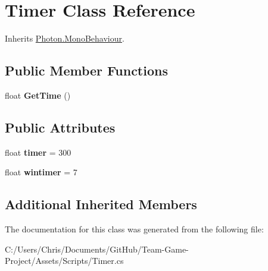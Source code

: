 \hypertarget{class_timer}{}\section{Timer Class Reference}
\label{class_timer}


Inherits \hyperlink{class_photon_1_1_mono_behaviour}{Photon.\+Mono\+Behaviour}.

\subsection*{Public Member Functions}
\begin{DoxyCompactItemize}
\item 
float {\bfseries Get\+Time} ()\hypertarget{class_timer_a9e4207f2a92a1fab9b42559291cb82ee}{}\label{class_timer_a9e4207f2a92a1fab9b42559291cb82ee}

\end{DoxyCompactItemize}
\subsection*{Public Attributes}
\begin{DoxyCompactItemize}
\item 
float {\bfseries timer} = 300\hypertarget{class_timer_a48d2822824c9cc04cf85b5b9603a7934}{}\label{class_timer_a48d2822824c9cc04cf85b5b9603a7934}

\item 
float {\bfseries wintimer} = 7\hypertarget{class_timer_ab7214a0f30fef446a7a65fe41b7ac1eb}{}\label{class_timer_ab7214a0f30fef446a7a65fe41b7ac1eb}

\end{DoxyCompactItemize}
\subsection*{Additional Inherited Members}


The documentation for this class was generated from the following file\+:\begin{DoxyCompactItemize}
\item 
C\+:/\+Users/\+Chris/\+Documents/\+Git\+Hub/\+Team-\/\+Game-\/\+Project/\+Assets/\+Scripts/Timer.\+cs\end{DoxyCompactItemize}
